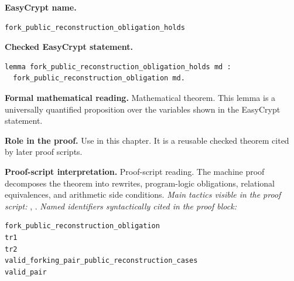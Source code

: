 \begin{formaltheorem}
\noindent\textbf{EasyCrypt name.}
\begin{lstlisting}[language=EasyCrypt,basicstyle=\ttfamily\scriptsize]
fork_public_reconstruction_obligation_holds
\end{lstlisting}
\noindent\textbf{Checked EasyCrypt statement.}
\begin{lstlisting}[language=EasyCrypt,basicstyle=\ttfamily\scriptsize]
lemma fork_public_reconstruction_obligation_holds md :
  fork_public_reconstruction_obligation md.
\end{lstlisting}
\noindent\textbf{Formal mathematical reading.}
Mathematical theorem. This lemma is a universally quantified proposition over the variables shown in the EasyCrypt statement.

\noindent\textbf{Role in the proof.}
Use in this chapter. It is a reusable checked theorem cited by later proof scripts.

\noindent\textbf{Proof-script interpretation.}
Proof-script reading. The machine proof decomposes the theorem into rewrites, program-logic obligations, relational equivalences, and arithmetic side conditions.
\emph{Main tactics visible in the proof script:} , .
\emph{Named identifiers syntactically cited in the proof block:}
\begin{lstlisting}[language=EasyCrypt,basicstyle=\ttfamily\scriptsize]
fork_public_reconstruction_obligation
tr1
tr2
valid_forking_pair_public_reconstruction_cases
valid_pair
\end{lstlisting}

\end{formaltheorem}

